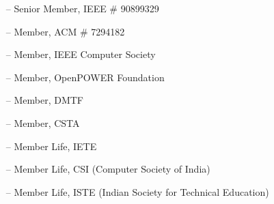 \begin{itemize}
	\item[--] Senior Member, IEEE  \# 90899329
	\item[--]
	Member, ACM  \#  7294182
	\item[--]
	Member, IEEE Computer Society 
	\item[--]
	Member, OpenPOWER Foundation 
	\item[--]
	Member, DMTF  
	\item[--]
	Member, CSTA
	\item[--]
	Member Life, IETE
	\item[--]
	Member Life, CSI (Computer Society of India) 
	\item[--]
	Member Life, ISTE (Indian Society for Technical Education) 
\end{itemize}
